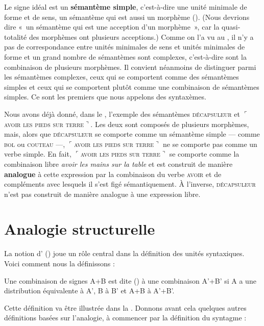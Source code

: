 Le signe idéal est un \textbf{sémantème simple}, c’est-à-dire une unité minimale de forme et de sens, un sémantème qui est aussi un morphème (). (Nous devrions dire «~un sémantème qui est une acception d’un morphème~», car la quasi-totalité des morphèmes ont plusieurs acceptions.) Comme on l’a vu au , il n’y a pas de correspondance entre unités minimales de sens et unités minimales de forme et un grand nombre de sémantèmes sont complexes, c’est-à-dire sont la combinaison de plusieurs morphèmes. Il convient néanmoins de distinguer parmi les sémantèmes complexes, ceux qui se comportent comme des sémantèmes simples et ceux qui se comportent plutôt comme une combinaison de sémantèmes simples. Ce sont les premiers que nous appelons des syntaxèmes.

Nous avons déjà donné, dans le , l’exemple des sémantèmes \textsc{décapsuleur} et $⌜$\textsc{avoir} \textsc{les} \textsc{pieds} \textsc{sur} \textsc{terre}$⌝$. Les deux sont composés de plusieurs morphèmes, mais, alors que \textsc{décapsuleur} se comporte comme un sémantème simple — comme \textsc{bol} ou \textsc{couteau} —, $⌜$\textsc{avoir} \textsc{les} \textsc{pieds} \textsc{sur} \textsc{terre}$⌝$ ne se comporte pas comme un verbe simple. En fait, $⌜$\textsc{avoir} \textsc{les} \textsc{pieds} \textsc{sur} \textsc{terre}$⌝$ se comporte comme la combinaison libre \textit{avoir les mains sur la table} et est construit de manière \textbf{analogue} à cette expression par la combinaison du verbe \textsc{avoir} et de compléments avec lesquels il s’est figé sémantiquement. À l’inverse, \textsc{décapsuleur} n’est pas construit de manière analogue à une expression libre.

\section{Analogie structurelle}\label{sec:3.1.2}

La notion d’ () joue un rôle central dans la définition des unités syntaxiques. Voici comment nous la définissons :

\begin{styleLivreImportant}
Une combinaison de signes A+B est dite ()  à une combinaison A’+B’ si A a une distribution équivalente à A’, B à B’ et A+B à A’+B’.
\end{styleLivreImportant}

Cette définition va être illustrée dans la . Donnons avant cela quelques autres définitions basées sur l’analogie, à commencer par la définition du syntagme :

